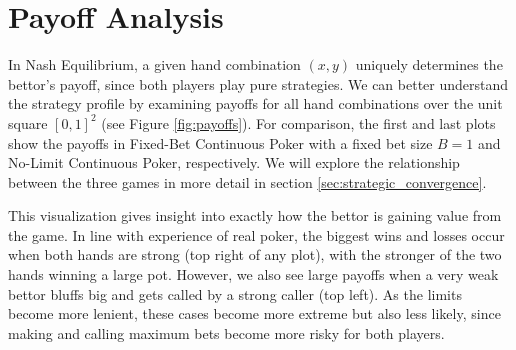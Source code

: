 \documentclass[../../main/main.tex]{subfiles}
\begin{document}
\section{Payoff Analysis}

In Nash Equilibrium, a given hand combination $(x, y)$ uniquely determines the bettor's payoff, since both players play pure strategies. We can better understand the strategy profile by examining payoffs for all hand combinations over the unit square $[0, 1]^2$ (see Figure \ref{fig:payoffs}). For comparison, the first and last plots show the payoffs in Fixed-Bet Continuous Poker with a fixed bet size $B=1$ and No-Limit Continuous Poker, respectively. We will explore the relationship between the three games in more detail in section \ref{sec:strategic_convergence}.

This visualization gives insight into exactly how the bettor is gaining value from the game. In line with experience of real poker, the biggest wins and losses occur when both hands are strong (top right of any plot), with the stronger of the two hands winning a large pot. However, we also see large payoffs when a very weak bettor bluffs big and gets called by a strong caller (top left). As the limits become more lenient, these cases become more extreme but also less likely, since making and calling maximum bets become more risky for both players. 
\end{document}
